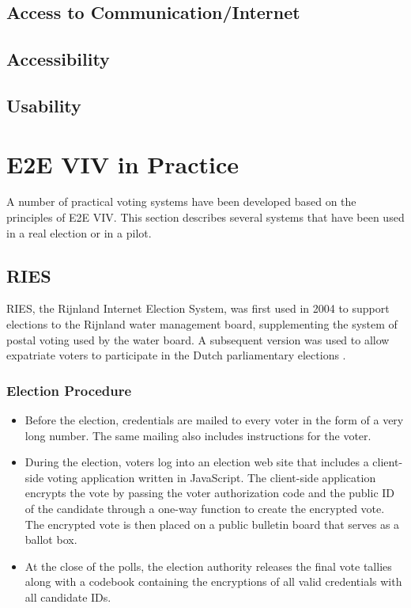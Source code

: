 \subsection{Access to Communication/Internet}
\subsection{Accessibility}
\subsection{Usability}
\section{E2E VIV in Practice}

A number of practical voting systems have been developed based on the
principles of E2E VIV. This section describes several systems that
have been used in a real election or in a pilot.


\subsection{RIES~\cite{hubbers2004}}

RIES, the Rijnland Internet Election System, was first used in 2004 to
support elections to the Rijnland water management board,
supplementing the system of postal voting used by the water board. A
subsequent version was used to allow expatriate voters to participate
in the Dutch parliamentary elections \cite{gonggrijp2009}.

\subsubsection{Election Procedure}

\begin{itemize}

\item Before the election, credentials are mailed to every voter in
  the form of a very long number. The same mailing also includes
  instructions for the voter.

\item During the election, voters log into an election web site that
  includes a client-side voting application written in JavaScript. The
  client-side application encrypts the vote by passing the voter
  authorization code and the public ID of the candidate through a
  one-way function to create the encrypted vote. The encrypted vote
  is then placed on a public bulletin board that serves as a ballot
  box.

\item At the close of the polls, the election authority releases the
  final vote tallies along with a codebook containing the encryptions
  of all valid credentials with all candidate IDs.

\end{itemize}

